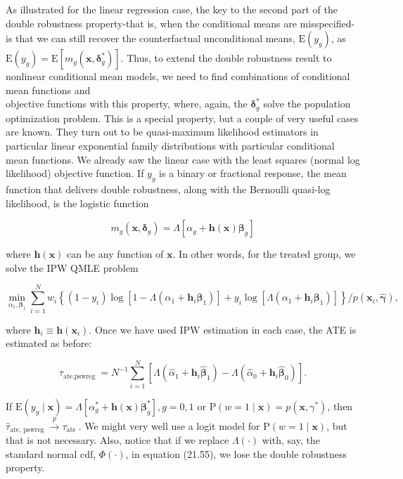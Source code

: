 \documentclass[10pt]{article}
\begin{document}
As illustrated for the linear regression case, the key to the second part of the double robustness property-that is, when the conditional means are misspecified-is that we can still recover the counterfactual unconditional means, $\mathrm{E}\left(y_{g}\right)$, as $\mathrm{E}\left(y_{g}\right)= \mathrm{E}\left[m_{g}\left(\mathbf{x}, \boldsymbol{\delta}_{g}^{*}\right)\right]$. Thus, to extend the double robustness result to nonlinear conditional mean models, we need to find combinations of conditional mean functions and\\
objective functions with this property, where, again, the $\boldsymbol{\delta}_{g}^{*}$ solve the population optimization problem. This is a special property, but a couple of very useful cases are known. They turn out to be quasi-maximum likelihood estimators in particular linear exponential family distributions with particular conditional mean functions. We already saw the linear case with the least squares (normal log likelihood) objective function. If $y_{g}$ is a binary or fractional response, the mean function that delivers double robustness, along with the Bernoulli quasi-log likelihood, is the logistic function


\begin{equation*}
m_{g}\left(\mathbf{x}, \boldsymbol{\delta}_{g}\right)=\Lambda\left[\alpha_{g}+\mathbf{h}(\mathbf{x}) \boldsymbol{\beta}_{g}\right] \tag{21.55}
\end{equation*}


where $\mathbf{h}(\mathbf{x})$ can be any function of $\mathbf{x}$. In other words, for the treated group, we solve the IPW QMLE problem

$$
\min _{\alpha_{1}, \boldsymbol{\beta}_{1}} \sum_{i=1}^{N} w_{i}\left\{\left(1-y_{i}\right) \log \left[1-\Lambda\left(\alpha_{1}+\mathbf{h}_{i} \boldsymbol{\beta}_{1}\right)\right]+y_{i} \log \left[\Lambda\left(\alpha_{1}+\mathbf{h}_{i} \boldsymbol{\beta}_{1}\right)\right]\right\} / p\left(\mathbf{x}_{i}, \hat{\boldsymbol{\gamma}}\right),
$$

where $\mathbf{h}_{i} \equiv \mathbf{h}\left(\mathbf{x}_{i}\right)$. Once we have used IPW estimation in each case, the ATE is estimated as before:

$$
\hat{\tau}_{\text {ate,pswreg }}=N^{-1} \sum_{i=1}^{N}\left[\Lambda\left(\hat{\alpha}_{1}+\mathbf{h}_{i} \hat{\boldsymbol{\beta}}_{1}\right)-\Lambda\left(\hat{\alpha}_{0}+\mathbf{h}_{i} \hat{\boldsymbol{\beta}}_{0}\right)\right] .
$$

If $\mathrm{E}\left(y_{g} \mid \mathbf{x}\right)=\Lambda\left[\alpha_{g}^{*}+\mathbf{h}(\mathbf{x}) \boldsymbol{\beta}_{g}^{*}\right], g=0,1$ or $\mathrm{P}(w=1 \mid \mathbf{x})=p\left(\mathbf{x}, \gamma^{*}\right)$, then $\hat{\tau}_{\text {ate, pswreg }} \xrightarrow{p} \tau_{\text {ate }}$. We might very well use a logit model for $\mathrm{P}(w=1 \mid \mathbf{x})$, but that is not necessary. Also, notice that if we replace $\Lambda(\cdot)$ with, say, the standard normal cdf, $\Phi(\cdot)$, in equation (21.55), we lose the double robustness property.
\end{document}
